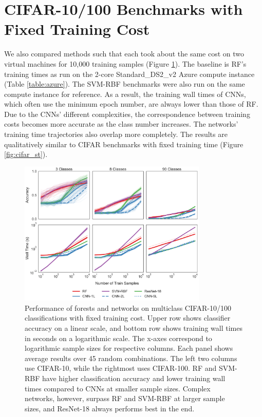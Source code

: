 \section{CIFAR-10/100 Benchmarks with Fixed Training Cost}
\label{app:cifar_sc}
We also compared methods such that each took about the same cost on two virtual machines for 10,000 training samples (Figure \ref{fig:cifar_sc}). The baseline is RF's training times as run on the 2-core Standard\_DS2\_v2 Azure compute instance (Table \ref{table:azure}). The SVM-RBF benchmarks were also run on the same compute instance for reference. As a result, the training wall times of CNNs, which often use the minimum epoch number, are always lower than those of RF. Due to the CNNs' different complexities, the correspondence between training costs becomes more accurate as the class number increases. The networks' training time trajectories also overlap more completely. The results are qualitatively similar to CIFAR benchmarks with fixed training time (Figure \ref{fig:cifar_st}).

\begin{figure}[!htb]
\centering
\includegraphics[width=0.8\textwidth]{figures/cifar_sc.pdf}
  \caption{Performance of forests and networks on multiclass CIFAR-10/100 classifications with fixed training cost.
  Upper row shows classifier accuracy on a linear scale, and bottom row shows training wall times in seconds on a logarithmic scale. The x-axes correspond to logarithmic sample sizes for respective columns. Each panel shows average results over 45 random combinations. The left two columns use CIFAR-10, while the rightmost uses CIFAR-100.
  RF and SVM-RBF have higher classification accuracy and lower training wall times compared to CNNs at smaller sample sizes. Complex networks, however, surpass RF and SVM-RBF at larger sample sizes, and ResNet-18 always performs best in the end.
  }
\label{fig:cifar_sc}
\end{figure}
\clearpage

